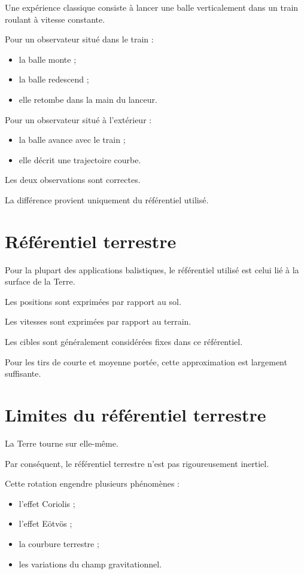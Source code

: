 Une expérience classique consiste à lancer une balle verticalement dans un
train roulant à vitesse constante.

Pour un observateur situé dans le train :

\begin{itemize}
    \item la balle monte ;
    \item la balle redescend ;
    \item elle retombe dans la main du lanceur.
\end{itemize}

Pour un observateur situé à l'extérieur :

\begin{itemize}
    \item la balle avance avec le train ;
    \item elle décrit une trajectoire courbe.
\end{itemize}

Les deux observations sont correctes.

La différence provient uniquement du référentiel utilisé.

\section{Référentiel terrestre}

Pour la plupart des applications balistiques, le référentiel utilisé est celui
lié à la surface de la Terre.

Les positions sont exprimées par rapport au sol.

Les vitesses sont exprimées par rapport au terrain.

Les cibles sont généralement considérées fixes dans ce référentiel.

Pour les tirs de courte et moyenne portée, cette approximation est largement
suffisante.

\section{Limites du référentiel terrestre}

La Terre tourne sur elle-même.

Par conséquent, le référentiel terrestre n'est pas rigoureusement inertiel.

Cette rotation engendre plusieurs phénomènes :

\begin{itemize}
    \item l'effet Coriolis ;
    \item l'effet Eötvös ;
    \item la courbure terrestre ;
    \item les variations du champ gravitationnel.
\end{itemize}

